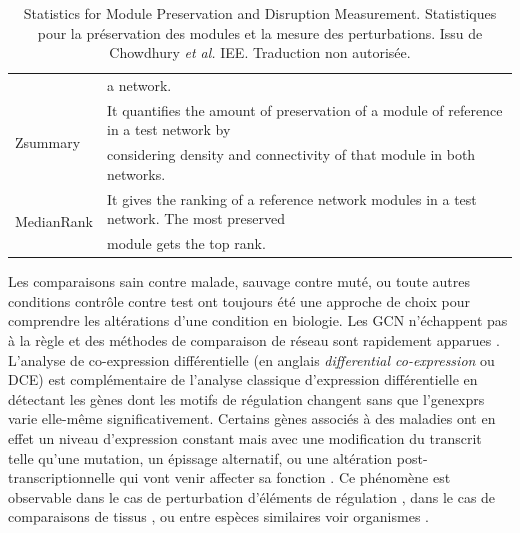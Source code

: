 \begin{table}[b]
{\begin{tabular}{@{}ll@{}}
                                                                                            & a network.                                                                                          \\
\multirow{2}{*}{Zsummary \cite{Langfelder2011}}                                                         & It quantifies the amount of preservation of a module of reference in a test network by              \\
                                                                                            & considering density and connectivity of that module in both networks.                               \\
\multirow{2}{*}{MedianRank \cite{Langfelder2011}}                                                       & It gives the ranking of a reference network modules in a test network. The most preserved           \\
                                                                                            & module gets the top rank.                                                                           \\ \cmidrule(l){2-2} 
\end{tabular}
}
\caption[Statistiques pour la préservation des modules et la mesure des perturbations]{Statistics for Module Preservation and Disruption Measurement. Statistiques pour la préservation des modules et la mesure des perturbations. Issu de Chowdhury \textit{et al.} \cite{Chowdhury2019}  IEE. Traduction non autorisée.}
\label{table:chowdury_metrics_DCE}
\end{table}

Les comparaisons sain contre malade, sauvage contre muté, ou toute autres \glspl{condition} contrôle contre test ont toujours été une approche de choix pour comprendre les altérations d'une condition en biologie. Les \acrshort{GCN} n'échappent pas à la règle et des méthodes de comparaison de réseau sont rapidement apparues \cite{Lai2004Nov}. L'analyse de co-expression différentielle (en anglais \textit{differential co-expression} ou DCE) est complémentaire de l'analyse classique d'expression différentielle en détectant les gènes dont les motifs de régulation changent sans que l'\glspl{genexpr} varie elle-même significativement. Certains gènes associés à des maladies ont en effet un niveau d'expression constant mais avec une modification du transcrit telle qu'une mutation, un épissage alternatif, ou une altération post-transcriptionnelle qui vont venir affecter sa fonction \cite{delaFuente2010Jul}. Ce phénomène est observable dans le cas de perturbation d'éléments de régulation \cite{Rotival2013}, dans le cas de comparaisons de tissus \cite{Gov2017}, ou entre espèces similaires voir \glspl{organisme} \cite{Chowdhury2019}.


